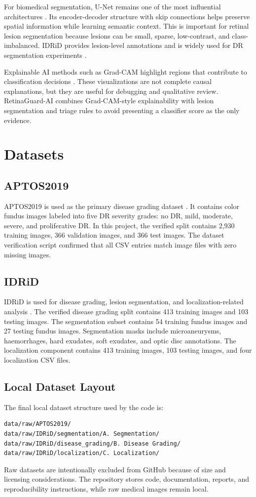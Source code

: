 \documentclass[conference]{IEEEtran}
\begin{document}
For biomedical segmentation, U-Net remains one of the most influential architectures \cite{ronneberger2015unet}. Its encoder-decoder structure with skip connections helps preserve spatial information while learning semantic context. This is important for retinal lesion segmentation because lesions can be small, sparse, low-contrast, and class-imbalanced. IDRiD provides lesion-level annotations and is widely used for DR segmentation experiments \cite{porwal2018idrid}.

Explainable AI methods such as Grad-CAM highlight regions that contribute to classification decisions \cite{selvaraju2017gradcam}. These visualizations are not complete causal explanations, but they are useful for debugging and qualitative review. RetinaGuard-AI combines Grad-CAM-style explainability with lesion segmentation and triage rules to avoid presenting a classifier score as the only evidence.

\section{Datasets}
\subsection{APTOS2019}
APTOS2019 is used as the primary disease grading dataset \cite{aptos2019}. It contains color fundus images labeled into five DR severity grades: no DR, mild, moderate, severe, and proliferative DR. In this project, the verified split contains 2,930 training images, 366 validation images, and 366 test images. The dataset verification script confirmed that all CSV entries match image files with zero missing images.

\subsection{IDRiD}
IDRiD is used for disease grading, lesion segmentation, and localization-related analysis \cite{porwal2018idrid}. The verified disease grading split contains 413 training images and 103 testing images. The segmentation subset contains 54 training fundus images and 27 testing fundus images. Segmentation masks include microaneurysms, haemorrhages, hard exudates, soft exudates, and optic disc annotations. The localization component contains 413 training images, 103 testing images, and four localization CSV files.

\subsection{Local Dataset Layout}
The final local dataset structure used by the code is:
\begin{verbatim}
data/raw/APTOS2019/
data/raw/IDRiD/segmentation/A. Segmentation/
data/raw/IDRiD/disease_grading/B. Disease Grading/
data/raw/IDRiD/localization/C. Localization/
\end{verbatim}
Raw datasets are intentionally excluded from GitHub because of size and licensing considerations. The repository stores code, documentation, reports, and reproducibility instructions, while raw medical images remain local.
\end{document}
